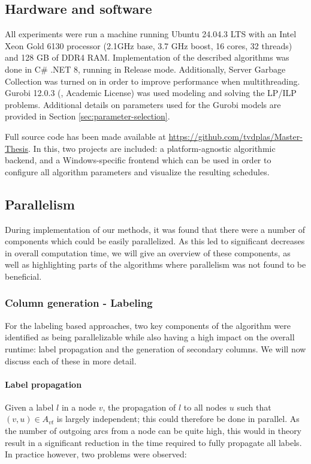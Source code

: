\documentclass[]{article}
\begin{document}
\subsection{Hardware and software}
All experiments were run a machine running Ubuntu 24.04.3 LTS with an Intel Xeon Gold 6130 processor (2.1GHz base, 3.7 GHz boost, 16 cores, 32 threads) and 128 GB of DDR4 RAM.  Implementation of the described algorithms was done in C\# .NET 8, running in Release mode. Additionally, Server Garbage Collection was turned on in order to improve performance when multithreading. Gurobi 12.0.3 (\citet{Gurobi2025}, Academic License) was used modeling and solving the LP/ILP problems. Additional details on parameters used for the Gurobi models are provided in Section \ref{sec:parameter-selection}.

Full source code has been made available at \url{https://github.com/tvdplas/Master-Thesis}. In this, two projects are included: a platform-agnostic algorithmic backend, and a Windows-specific frontend which can be used in order to configure all algorithm parameters and visualize the resulting schedules.

\subsection{Parallelism}
During implementation of our methods, it was found that there were a number of components which could be easily parallelized. As this led to significant decreases in overall computation time, we will give an overview of these components, as well as highlighting parts of the algorithms where parallelism was not found to be beneficial.

\subsubsection{Column generation - Labeling}
For the labeling based approaches, two key components of the algorithm were identified as being parallelizable while also having a high impact on the overall runtime: label propagation and the generation of secondary columns. We will now discuss each of these in more detail. 

\paragraph{Label propagation}
Given a label $l$ in a node $v$, the propagation of $l$ to all nodes $u$ such that $(v, u) \in A_{vt}$ is largely independent; this could therefore be done in parallel. As the number of outgoing arcs from a node can be quite high, this would in theory result in a significant reduction in the time required to fully propagate all labels. In practice however, two problems were observed: 
\end{document}
